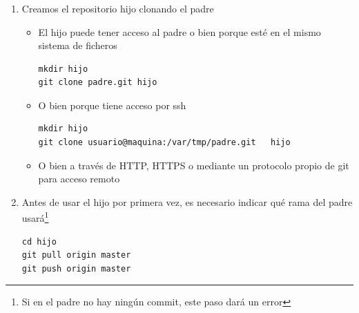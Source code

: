 \documentclass[ucs]{beamer}
\begin{document}
\begin{frame}[fragile]
\frametitle{}

\begin{enumerate}
\item
Creamos el repositorio hijo clonando el padre
\begin{itemize}
\item
El hijo puede tener acceso al padre o bien porque esté en el mismo
sistema de ficheros

  \begin{scriptsize}
  \begin{verbatim}
mkdir hijo
git clone padre.git hijo
  \end{verbatim}
  \end{scriptsize}

\item
O bien porque tiene acceso por ssh


  \begin{scriptsize}
  \begin{verbatim}
mkdir hijo
git clone usuario@maquina:/var/tmp/padre.git   hijo
  \end{verbatim}
  \end{scriptsize}
\item
O bien a través de HTTP, HTTPS o mediante 
un protocolo propio de git para acceso remoto
\end{itemize}


\item
Antes de usar el hijo por primera vez, es necesario indicar
qué rama del padre usará\footnote{Si en el padre no hay ningún commit,
este paso dará un error}


  \begin{scriptsize}
  \begin{verbatim}
cd hijo
git pull origin master
git push origin master
  \end{verbatim}
  \end{scriptsize}

\end{enumerate}

\end{frame}
\end{document}
